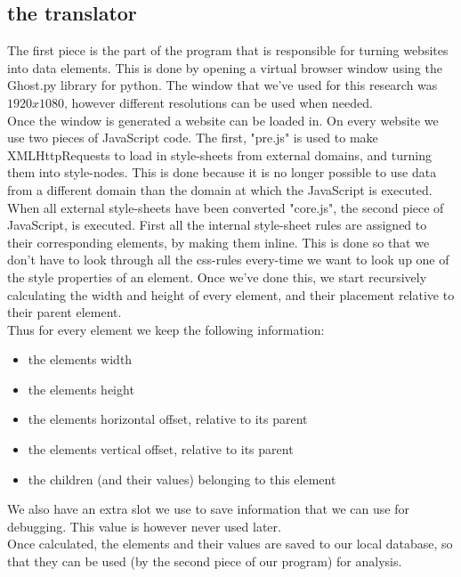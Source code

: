 \subsection{the translator}
The first piece is the part of the program that is responsible for turning websites into data elements. This is done by opening a virtual browser window using the Ghost.py library for python. The window that we've used for this research was $1920x1080$, however different resolutions can be used when needed.\\
Once the window is generated a website can be loaded in. On every website we use two pieces of JavaScript code. The first, "pre.js" is used to make XMLHttpRequests to load in style-sheets from external domains, and turning them into style-nodes. This is done because it is no longer possible to use data from a different domain than the domain at which the JavaScript is executed.\\
When all external style-sheets have been converted "core.js", the second piece of JavaScript, is executed. First all the internal style-sheet rules are assigned to their corresponding elements, by making them inline. This is done so that we don't have to look through all the css-rules every-time we want to look up one of the style properties of an element. Once we've done this, we start recursively calculating the width and height of every element, and their placement relative to their parent element.\\
Thus for every element we keep the following information:
\begin{itemize}
	\item the elements width
	\item the elements height
	\item the elements horizontal offset, relative to its parent
	\item the elements vertical offset, relative to its parent
	\item the children (and their values) belonging to this element
\end{itemize}
We also have an extra slot we use to save information that we can use for debugging. This value is however never used later.\\
Once calculated, the elements and their values are saved to our local database, so that they can be used (by the second piece of our program) for analysis.

